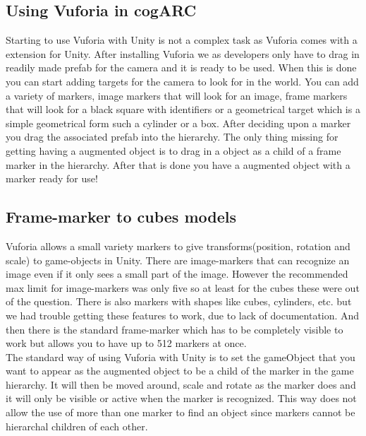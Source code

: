\subsection{Using Vuforia in cogARC}
\label{subsec:usingVuforiaincogARC}
Starting to use Vuforia with Unity is not a complex task as Vuforia comes with a extension for Unity.
After installing Vuforia we as developers only have to drag in readily made \gls{prefab} for the camera and it is ready to be used.
When this is done you can start adding targets for the camera to look for in the world.
You can add a variety of markers, image markers that will look for an image, frame markers that will look for a black square with identifiers or a geometrical target which is a simple geometrical form such a cylinder or a box.
After deciding upon a marker you drag the associated prefab into the hierarchy.
The only thing missing for getting having a augmented object is to drag in a object as a child of a frame marker in the hierarchy.
After that is done you have a augmented object with a marker ready for use!

\subsection{Frame-marker to cubes models}
\label{subsec:framemarker_model} 
Vuforia allows a small variety markers to give transforms(position, rotation and scale) to game-objects in Unity. 
There are image-markers that can recognize an image even if it only sees a small part of the image. 
However the recommended max limit for image-markers was only five so at least for the cubes these were out of the question. 
There is also markers with shapes like cubes, cylinders, etc. but we had trouble getting these features to work, due to lack of documentation. 
And then there is the standard frame-marker which has to be completely visible to work but allows you to have up to 512 markers at once.\\
The standard way of using Vuforia with Unity is to set the gameObject that you want to appear as the augmented object to be a child of the marker in the game hierarchy. 
It will then be moved around, scale and rotate as the marker does and it will only be visible or active when the marker is recognized. 
This way does not allow the use of more than one marker to find an object since markers cannot be hierarchal children of each other. 

